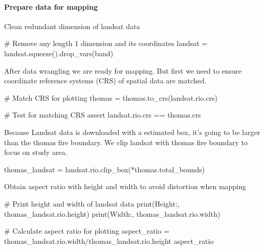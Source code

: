 \documentclass[
  letterpaper,
  DIV=11,
  numbers=noendperiod]{scrartcl}
\let\oldparagraph\paragraph
\renewcommand{\paragraph}[1]{\oldparagraph{#1}\mbox{}}
\newenvironment{Shaded}{\begin{snugshade}}{\end{snugshade}}
\newcommand{\BuiltInTok}[1]{\textcolor[rgb]{0.00,0.23,0.31}{#1}}
\newcommand{\CommentTok}[1]{\textcolor[rgb]{0.37,0.37,0.37}{#1}}
\newcommand{\ControlFlowTok}[1]{\textcolor[rgb]{0.00,0.23,0.31}{#1}}
\newcommand{\NormalTok}[1]{\textcolor[rgb]{0.00,0.23,0.31}{#1}}
\newcommand{\OperatorTok}[1]{\textcolor[rgb]{0.37,0.37,0.37}{#1}}
\newcommand{\StringTok}[1]{\textcolor[rgb]{0.13,0.47,0.30}{#1}}
\begin{document}
\hypertarget{prepare-data-for-mapping}{%
\paragraph{Prepare data for mapping}\label{prepare-data-for-mapping}}

Clean redundant dimension of landsat data

\begin{Shaded}
\begin{Highlighting}[]
\CommentTok{\# Remove any length 1 dimension and its coordinates}
\NormalTok{landsat }\OperatorTok{=}\NormalTok{ landsat.squeeze().drop\_vars(}\StringTok{\textquotesingle{}band\textquotesingle{}}\NormalTok{)}
\end{Highlighting}
\end{Shaded}

After data wrangling we are ready for mapping. But first we need to
ensure coordinate reference systems (CRS) of spatial data are matched.

\begin{Shaded}
\begin{Highlighting}[]

\CommentTok{\# Match CRS for plotting}
\NormalTok{thomas }\OperatorTok{=}\NormalTok{ thomas.to\_crs(landsat.rio.crs)}

\CommentTok{\# Test for matching CRS}
\ControlFlowTok{assert}\NormalTok{ landsat.rio.crs }\OperatorTok{==}\NormalTok{ thomas.crs}
\end{Highlighting}
\end{Shaded}

Because Landsat data is downloaded with a estimated box, it's going to
be larger than the thomas fire boundary. We clip landsat with thomas
fire boundary to focus on study area.

\begin{Shaded}
\begin{Highlighting}[]
\NormalTok{thomas\_landsat }\OperatorTok{=}\NormalTok{ landsat.rio.clip\_box(}\OperatorTok{*}\NormalTok{thomas.total\_bounds)}
\end{Highlighting}
\end{Shaded}

Obtain aspect ratio with height and width to avoid distortion when
mapping

\begin{Shaded}
\begin{Highlighting}[]
\CommentTok{\# Print height and width of landsat data}
\BuiltInTok{print}\NormalTok{(}\StringTok{\textquotesingle{}Height:\textquotesingle{}}\NormalTok{, thomas\_landsat.rio.height)}
\BuiltInTok{print}\NormalTok{(}\StringTok{\textquotesingle{}Width:\textquotesingle{}}\NormalTok{, thomas\_landsat.rio.width)}

\CommentTok{\# Calculate aspect ratio for plotting }
\NormalTok{aspect\_ratio }\OperatorTok{=}\NormalTok{ thomas\_landsat.rio.width}\OperatorTok{/}\NormalTok{thomas\_landsat.rio.height}
\NormalTok{aspect\_ratio}
\end{Highlighting}
\end{Shaded}
\end{document}
